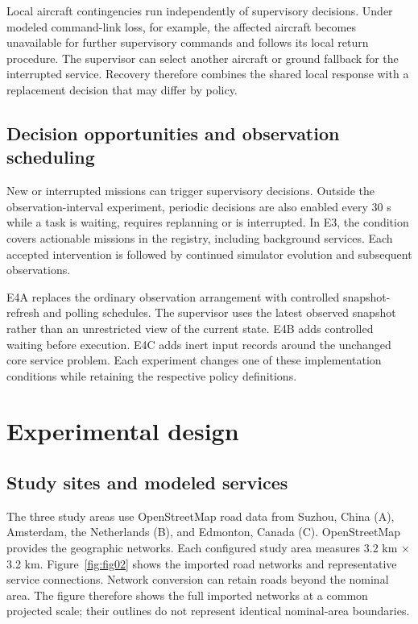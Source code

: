 \documentclass[]{interact}
\theoremstyle{plain}
\theoremstyle{definition}
\theoremstyle{remark}
\begin{document}
Local aircraft contingencies run independently of supervisory decisions. Under modeled command-link loss, for example, the affected aircraft becomes unavailable for further supervisory commands and follows its local return procedure. The supervisor can select another aircraft or ground fallback for the interrupted service. Recovery therefore combines the shared local response with a replacement decision that may differ by policy.

\subsection{Decision opportunities and observation scheduling}

New or interrupted missions can trigger supervisory decisions. Outside the observation-interval experiment, periodic decisions are also enabled every 30 s while a task is waiting, requires replanning or is interrupted. In E3, the condition covers actionable missions in the registry, including background services. Each accepted intervention is followed by continued simulator evolution and subsequent observations.

E4A replaces the ordinary observation arrangement with controlled snapshot-refresh and polling schedules. The supervisor uses the latest observed snapshot rather than an unrestricted view of the current state. E4B adds controlled waiting before execution. E4C adds inert input records around the unchanged core service problem. Each experiment changes one of these implementation conditions while retaining the respective policy definitions.

\section{Experimental design}

\subsection{Study sites and modeled services}

The three study areas use OpenStreetMap road data from Suzhou, China (A), Amsterdam, the Netherlands (B), and Edmonton, Canada (C). OpenStreetMap provides the geographic networks. \citep{ref14} Each configured study area measures 3.2 km $\times$ 3.2 km. Figure~\ref{fig:fig02} shows the imported road networks and representative service connections. Network conversion can retain roads beyond the nominal area. The figure therefore shows the full imported networks at a common projected scale; their outlines do not represent identical nominal-area boundaries.
\end{document}
